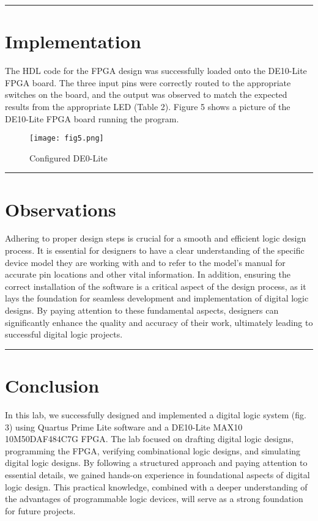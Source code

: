 \documentclass[11pt]{article}
\begin{document}
\vspace{5mm}
\hrule

\section*{\textcolor{mycolor}{Implementation}}
The HDL code for the FPGA design was successfully loaded onto the DE10-Lite FPGA board. The three input pins were correctly routed to the appropriate switches on the board, and the output was observed to match the expected results from the appropriate LED (Table 2). Figure 5 shows a picture of the DE10-Lite FPGA board running the program.
\begin{figure}[H]
  \centering
  \texttt{[image: fig5.png]}
  \caption{Configured DE0-Lite}
  \label{fig:5}
\end{figure}

\vspace{5mm}
\hrule

\section*{\textcolor{mycolor}{Observations}}
Adhering to proper design steps is crucial for a smooth and efficient logic design process. It is essential for designers to have a clear understanding of the specific device model they are working with and to refer to the model's manual for accurate pin locations and other vital information. In addition, ensuring the correct installation of the software is a critical aspect of the design process, as it lays the foundation for seamless development and implementation of digital logic designs. By paying attention to these fundamental aspects, designers can significantly enhance the quality and accuracy of their work, ultimately leading to successful digital logic projects.

\vspace{5mm}
\hrule

\section*{\textcolor{mycolor}{Conclusion}}
In this lab, we successfully designed and implemented a digital logic system (fig. 3) using Quartus Prime Lite software and a DE10-Lite MAX10 10M50DAF484C7G FPGA. The lab focused on drafting digital logic designs, programming the FPGA, verifying combinational logic designs, and simulating digital logic designs. By following a structured approach and paying attention to essential details, we gained hands-on experience in foundational aspects of digital logic design. This practical knowledge, combined with a deeper understanding of the advantages of programmable logic devices, will serve as a strong foundation for future projects.
\end{document}
